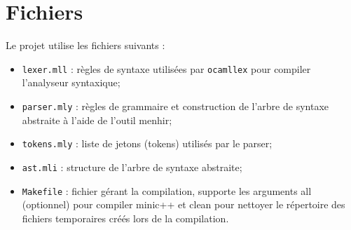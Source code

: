 \documentclass{article}
\begin{document}
\section*{Fichiers}
Le projet utilise les fichiers suivants :
\begin{itemize}
  \item \texttt{lexer.mll} : règles de syntaxe utilisées par \texttt{ocamllex} pour
    compiler l'analyseur syntaxique;
  \item \texttt{parser.mly} : règles de grammaire et construction de l'arbre de
    syntaxe abstraite à l'aide de l'outil menhir;
  \item \texttt{tokens.mly} : liste de jetons (tokens) utilisés par le parser;
  \item \texttt{ast.mli} : structure de l'arbre de syntaxe abstraite;
  \item \texttt{Makefile} : fichier gérant la compilation, supporte les
    arguments all (optionnel) pour compiler minic++ et clean pour
    nettoyer le répertoire des fichiers temporaires créés lors de la compilation.
\end{itemize}
  
\end{document}

